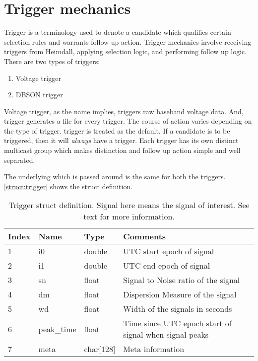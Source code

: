 \section {Trigger mechanics}
\label{sec:tmech}

\par Trigger is a terminology used to denote a candidate which qualifies certain selection rules and warrants follow up action. Trigger mechanics involve receiving triggers from Heimdall, applying selection logic, and performing follow up logic. 
There are two types of triggers: 
\begin{enumerate}
	\item Voltage trigger
	\item DBSON trigger
\end{enumerate}
Voltage trigger, as the name implies, triggers raw baseband voltage data. And, \dbson trigger generates a \dbson file for every trigger. The course of action varies depending on the type of trigger. 
\dbson trigger is treated as the default. If a candidate is to be triggered, then it will \emph{always} have a \dbson trigger.
Each trigger has its own distinct multicast group which makes distinction and follow up action simple and well separated.

\par The underlying \struct which is passed around is the same for both the triggers. \autoref{struct:trigger} shows the struct definition. 
\begin{table}
	\begin{tabular}{llll} \toprule
			Index & Name       & Type          & Comments                                               \\ \midrule
			1     & i0         & double        & UTC start epoch of signal                              \\
			2     & i1         & double        & UTC end   epoch of signal                              \\
			3     & sn         & float         & Signal to Noise ratio of the signal                    \\
			4     & dm         & float         & Dispersion Measure of the signal                       \\
			5     & wd         & float         & Width of the signals in seconds                        \\
			6     & peak\_time & float         & Time since UTC epoch start of signal when signal peaks \\
			7     & meta       & char{[}128{]} & Meta information                                     \\
			\bottomrule
	\end{tabular}
	\caption {Trigger struct definition. Signal here means the signal of interest. See text for more information.}
	\label{struct:trigger}
\end{table}

